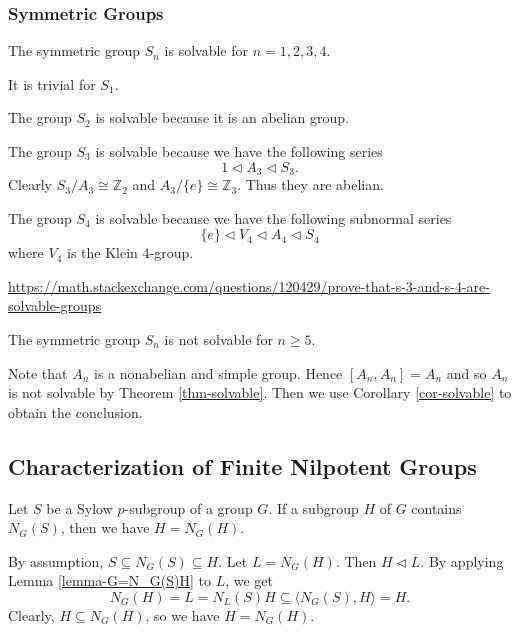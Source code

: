 \subsubsection{Symmetric Groups}
\begin{proposition}
	The symmetric group $S_n$ is solvable for $n=1,2,3,4$.
\end{proposition}
\begin{sketch} It is trivial for $S_1$.
	

	The group $S_2$ is solvable because it is an abelian group.
	
	The group $S_3$ is solvable because we have the following series
	\begin{equation*}
		1 \lhd A_3 \lhd S_3.
	\end{equation*}
	Clearly  $S_3/A_3\cong \mathbb{Z}_2$ and $A_3/\{e\} \cong \mathbb{Z}_3$. Thus they are abelian.  
	
	The group $S_4$ is solvable because we have the following subnormal series
	\begin{equation*}
		\{e\} \lhd V_4 \lhd A_4\lhd S_4
	\end{equation*}
	where $V_4$ is the Klein $4$-group.
	
	\url{https://math.stackexchange.com/questions/120429/prove-that-s-3-and-s-4-are-solvable-groups}
\end{sketch}
\begin{proposition}
	The symmetric group $S_n$ is not solvable for $n\geq 5$.
\end{proposition}
\begin{sketch}
	Note that $A_n$ is a nonabelian and simple group. Hence $[A_n,A_n] = A_n$ and so $A_n$ is not solvable by Theorem \ref{thm-solvable}. Then we use Corollary \ref{cor-solvable} to obtain the conclusion.
\end{sketch}

\subsection{Characterization of Finite Nilpotent Groups}



\begin{lemma} \label{lemma-H=N_G(H)}
	Let $S$ be a Sylow $p$-subgroup of a group $G$. If a subgroup $H$ of $G$ contains $N_G(S)$, then we have $H = N_G(H)$.
\end{lemma}
\begin{sketch}
	By assumption, $S \subseteq N_G(S) \subseteq H$. Let $L = N_G(H)$. Then $H\lhd L$. By applying Lemma \ref{lemma-G=N_G(S)H} to $L$, we  get
	$$N_G(H)=L = N_L(S)H \subseteq \langle N_G(S), H \rangle = H.$$
	Clearly, $H \subseteq N_G(H)$, so we have $H = N_G(H)$.
\end{sketch}

